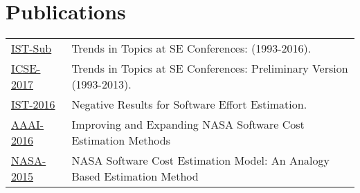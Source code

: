 \documentclass[]{bigfatnoob-resume}
\begin{document}
\begin{minipage}[t]{0.66\textwidth}
\section{Publications} 
\begin{tabular}{p{2cm}p{9.2cm}}
	\href{https://arxiv.org/abs/1608.08100}{IST-Sub} & Trends in Topics at SE Conferences: (1993-2016).\\
	\href{https://arxiv.org/abs/1608.08100}{ICSE-2017} & Trends in Topics at SE Conferences: Preliminary Version (1993-2013).\\
	\href{https://arxiv.org/abs/1609.05563}{IST-2016} & Negative Results for Software Effort Estimation.\\
	\href{http://ieeexplore.ieee.org/stamp/stamp.jsp?arnumber=7500655&tag=1}{AAAI-2016} & Improving and Expanding NASA Software Cost Estimation Methods \\
	\href{https://www.nasa.gov/sites/default/files/files/27_NASA_SC_SW_Cost_Model_final.pdf}{NASA-2015}  & NASA Software Cost Estimation Model: An Analogy Based Estimation Method\\
\end{tabular}
\sectionsep

\end{minipage} 
\end{document}
